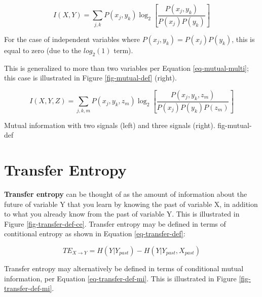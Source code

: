 \begin{equation}
I(X,Y) = \sum_{j,k} P(x_j,y_k) \log_2 \left [
\frac{P(x_j,y_k)}{P(x_j) P(y_k)} \right ]
\label{eq-mutual-def}
\end{equation}

For the case of independent variables where $P(x_j,y_k) = P(x_j) P(y_k)$,
this is equal to zero (due to the $log_2(1)$ term).

This is generalized to more than two variables per Equation
\ref{eq-mutual-multi}; this case is illustrated in Figure
\ref{fig-mutual-def} (right).

\begin{equation}
I(X,Y,Z) = \sum_{j,k,m} P(x_j,y_k,z_m) \log_2 \left [
\frac{P(x_j,y_k,z_m)}{P(x_j) P(y_k) P(z_m)} \right ]
\label{eq-mutual-multi}
\end{equation}

{Mutual information with two signals (left) and three signals (right).}
{fig-mutual-def}

\clearpage
%
\section{Transfer Entropy}
\label{sect-entropy-transfer}

\textbf{Transfer entropy} can be thought of as the amount of information
about the future of variable Y that you learn by knowing the past of
variable X, in addition to what you already know from the past of variable
Y. This is illustrated in Figure \ref{fig-transfer-def-ce}. Transfer entropy
may be defined in terms of contitional entropy as shown in
Equation \ref{eq-transfer-def}:

\begin{equation}
TE_{X \rightarrow Y} = H(Y|Y_{past}) - H(Y|Y_{past},X_{past})
\label{eq-transfer-def}
\end{equation}

Transfer entropy may alternatively be defined in terms of conditional
mutual information, per Equation \ref{eq-transfer-def-mi}. This is
illustrated in Figure \ref{fig-transfer-def-mi}.

